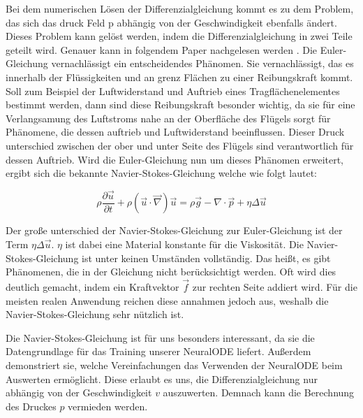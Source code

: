 Bei dem numerischen Lösen der Differenzialgleichung kommt es zu dem Problem, das sich das druck Feld p
abhängig von der Geschwindigkeit ebenfalls ändert.
Dieses Problem kann gelöst werden, indem die Differenzialgleichung in zwei Teile geteilt wird.
Genauer kann in folgendem Paper nachgelesen werden \cite{num_navier}.
Die Euler-Gleichung vernachlässigt ein entscheidendes Phänomen.
Sie vernachlässigt, das es innerhalb der Flüssigkeiten und an grenz Flächen zu einer Reibungskraft kommt.
Soll zum Beispiel der Luftwiderstand und Auftrieb eines Tragflächenelementes bestimmt werden,
dann sind diese Reibungskraft besonder wichtig, da sie für eine Verlangsamung des Luftstroms nahe an der Oberfläche
des Flügels sorgt für Phänomene, die dessen auftrieb und Luftwiderstand beeinflussen.
Dieser Druck unterschied zwischen der ober und unter Seite des Flügels sind verantwortlich für dessen Auftrieb.
Wird die Euler-Gleichung nun um dieses Phänomen erweitert, 
ergibt sich die bekannte Navier-Stokes-Gleichung \cite[Kapitel~1.4]{navier_stokes} 
welche wie folgt lautet:

$$
\rho \frac{\partial \vec{u}}{\partial t} + \rho (\vec{u} \cdot \vec{\nabla} ) \vec{u} = 
\rho \vec{g} - \nabla \cdot \vec{p} + \eta \Delta \vec{u}
$$

Der große unterschied der Navier-Stokes-Gleichung zur Euler-Gleichung ist der Term $\eta \Delta \vec{u}$.
$\eta$ ist dabei eine Material konstante für die Viskosität.
Die Navier-Stokes-Gleichung ist unter keinen Umständen vollständig.
Das heißt, es gibt Phänomenen, die in der Gleichung nicht berücksichtigt werden.
Oft wird dies deutlich gemacht, indem ein Kraftvektor $\vec{f}$ zur rechten Seite addiert wird.
Für die meisten realen Anwendung reichen diese annahmen jedoch aus, weshalb die Navier-Stokes-Gleichung sehr nützlich ist.

Die Navier-Stokes-Gleichung ist für uns besonders interessant, da sie die Datengrundlage für das Training unserer NeuralODE liefert.
Außerdem demonstriert sie, welche Vereinfachungen das Verwenden der NeuralODE beim Auswerten ermöglicht.
Diese erlaubt es uns, die Differenzialgleichung nur abhängig von der Geschwindigkeit $v$ auszuwerten.
Demnach kann die Berechnung des Druckes $p$ vermieden werden.

